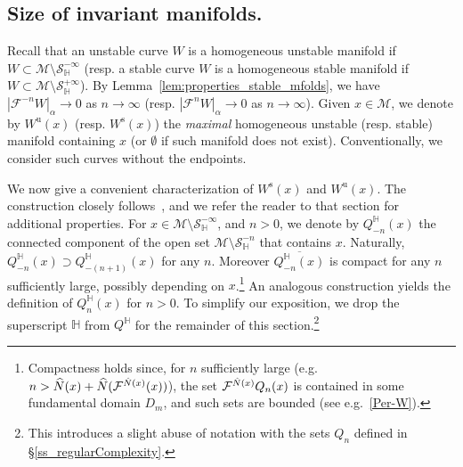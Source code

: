 \documentclass[AHL, Unicode, longabstracts,published]{cedram}
\newcommand{\unstable}{\text{u}}
\newcommand{\stable}{\text{s}}
\newcommand{\homo}{\mathbb{H}}
\newcommand{\cm}{\mathcal{F}}
\newcommand{\csp}{\mathcal{M}}
\newcommand{\Ws}{W^{\stable}}
\newcommand{\Wu}{W^{\unstable}}
\newcommand{\singPrivate}{\mathcal{S}}
\newcommand{\hsing}[1]{{\singPrivate}_\homo^{#1}}
\newcommand{\adm}{_{\alpha^{+}}}
\newcommand{\Np}{\hat N}
\newcommand{\Dom}{D}
\renewcommand{\adm}{_{\alpha}}
\let\oldhat\hat
\renewcommand*{\hat}[1]{\mathchoice{\widehat{#1}}{\widehat{#1}}{\oldhat{#1}}{\oldhat{#1}}}
\begin{document}
\subsection{Size of invariant manifolds.}\label{SSInvMan}
Recall that an unstable curve $W$ is a homogeneous unstable manifold if $W\subset\csp\setminus\hsing{-\infty}$ (resp. a stable curve $W$ is a homogeneous stable manifold if $W\subset\csp\setminus\hsing{+\infty}$). By Lemma~\ref{lem:properties_stable_mfolds}, we have $|\cm^{-n}W|\adm\to 0$ as $n\to\infty$ (resp. $|\cm^{n}W|\adm\to 0$ as $n\to\infty$). Given $x\in \csp$, we denote by $\Wu(x)$ (resp. $\Ws(x)$) the \emph{maximal} homogeneous unstable (resp. stable) manifold containing $x$ (or $\emptyset$ if such manifold does not exist). Conventionally, we consider such curves without the endpoints.

We now give a convenient characterization of $\Ws(x)$ and $\Wu(x)$. The construction closely follows~\cite[\S4.11]{ChM}, and we refer the reader to that section for additional properties. For $x\in\csp\setminus\hsing{-\infty}$, and $n > 0$, we denote by $Q^{\homo}_{-n}(x)$ the connected component of the open set $\csp\setminus\hsing{-n}$ that contains $x$. Naturally, $Q^{\homo}_{-n}(x)\supset Q^{\homo}_{-(n+1)}(x)$ for any $n$. Moreover $\overline{Q^{\homo}_{-n}(x)}$ is compact for any $n$ sufficiently large, possibly depending on $x$.\footnote{Compactness holds since, for $n$ sufficiently large (e.g. $n > \Np(x)+\Np(\cm^{\Np(x)}(x))$), the set $\cm^{\Np(x)}Q_n(x)$ is contained in some fundamental domain $\Dom_{m}$, and such sets are bounded (see e.g.~\eqref{Per-W}).} An analogous construction yields the definition of $Q^{\homo}_{n}(x)$ for $n > 0$. To simplify our exposition, we drop the superscript $\homo$ from $Q^{\homo}$ for the remainder of this section.\footnote{This introduces a slight abuse of notation with the sets $Q_{n}$ defined in \S\ref{ss_regularComplexity}.}
\end{document}
